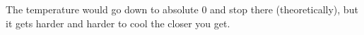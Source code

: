 The temperature would go down to absolute 0 and stop there (theoretically), but it gets harder and harder to cool the closer you get.